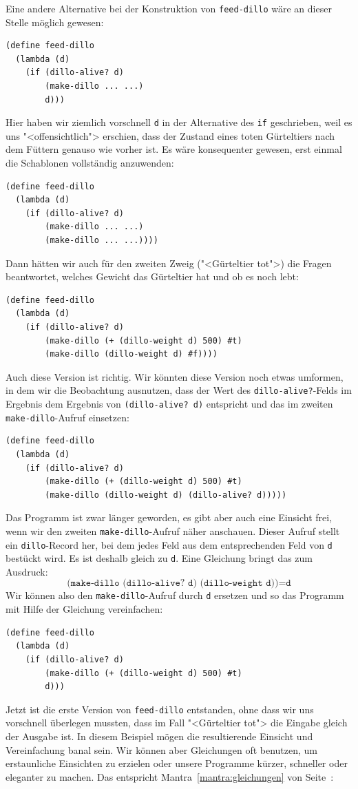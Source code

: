 Eine andere Alternative bei der Konstruktion von \texttt{feed-dillo}
wäre an dieser Stelle möglich gewesen:
%
\begin{verbatim}
(define feed-dillo
  (lambda (d)
    (if (dillo-alive? d)
        (make-dillo ... ...)
        d)))
\end{verbatim}
%
Hier haben wir ziemlich vorschnell \texttt{d} in der Alternative des
\texttt{if} geschrieben, weil es uns "<offensichtlich"> erschien, dass
der Zustand eines toten Gürteltiers nach dem Füttern genauso wie
vorher ist.  Es wäre konsequenter gewesen, erst einmal die Schablonen
vollständig anzuwenden:
%
\begin{verbatim}
(define feed-dillo
  (lambda (d)
    (if (dillo-alive? d)
        (make-dillo ... ...)
        (make-dillo ... ...))))
\end{verbatim}
%
Dann hätten wir auch für den zweiten Zweig ("<Gürteltier tot">) die Fragen beantwortet,
welches Gewicht das Gürteltier hat und ob es noch lebt:
%
\begin{verbatim}
(define feed-dillo
  (lambda (d)
    (if (dillo-alive? d)
        (make-dillo (+ (dillo-weight d) 500) #t)
        (make-dillo (dillo-weight d) #f))))
\end{verbatim}
%
Auch diese Version ist richtig.  Wir könnten diese Version noch etwas
umformen, in dem wir die Beobachtung ausnutzen, dass der Wert des
\texttt{dillo-alive?}-Felds im Ergebnis dem Ergebnis von
\texttt{(dillo-alive? d)} entspricht und das im zweiten
\texttt{make-dillo}-Aufruf einsetzen:
%
\begin{verbatim}
(define feed-dillo
  (lambda (d)
    (if (dillo-alive? d)
        (make-dillo (+ (dillo-weight d) 500) #t)
        (make-dillo (dillo-weight d) (dillo-alive? d)))))
\end{verbatim}
%
Das Programm ist zwar länger geworden, es gibt aber auch eine Einsicht
frei, wenn wir den zweiten \texttt{make-dillo}-Aufruf näher anschauen.
Dieser Aufruf stellt ein \texttt{dillo}-Record her, bei dem jedes Feld
aus dem entsprechenden Feld von \texttt{d} bestückt wird.  Es ist
deshalb gleich zu \texttt{d}.  Eine Gleichung bringt das zum Ausdruck:
%
\begin{displaymath}
  \texttt{(make-dillo (dillo-alive? d) (dillo-weight d))} = \texttt{d}
\end{displaymath}
%
Wir können also den \texttt{make-dillo}-Aufruf durch \texttt{d}
ersetzen und so das Programm mit Hilfe der Gleichung vereinfachen:
%
\begin{verbatim}
(define feed-dillo
  (lambda (d)
    (if (dillo-alive? d)
        (make-dillo (+ (dillo-weight d) 500) #t)
        d)))
\end{verbatim}
%
Jetzt ist die erste Version von \texttt{feed-dillo} entstanden, ohne
dass wir uns vorschnell überlegen mussten, dass im Fall "<Gürteltier
tot"> die Eingabe gleich der Ausgabe ist.  In diesem Beispiel mögen die
resultierende Einsicht und Vereinfachung banal sein.  Wir können aber
Gleichungen oft benutzen, um erstaunliche Einsichten zu erzielen oder
unsere Programme kürzer, schneller oder eleganter zu machen.  Das
entspricht Mantra~\ref{mantra:gleichungen} von
Seite~\pageref{mantra:gleichungen}:
%
\mantragleichungen%

